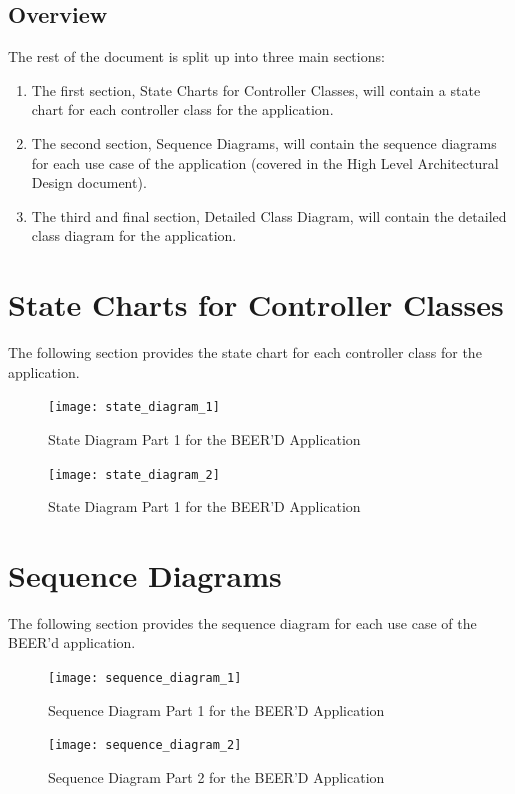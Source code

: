 \documentclass[]{article}
\begin{document}
\subsection{Overview}
\label{sub:overview}
The rest of the document is split up into three main sections:
\begin{enumerate}[-]
	\item The first section, State Charts for Controller Classes, will contain a state chart for each controller class for the application.
	\item The second section, Sequence Diagrams, will contain the sequence diagrams for each use case of the application (covered in the High Level Architectural Design document).
	\item The third and final section, Detailed Class Diagram, will contain the detailed class diagram for the application.
\end{enumerate}




\newpage
\section{State Charts for Controller Classes}
\label{sec:state_charts_for_controller_classes}
The following section provides the state chart for each controller class for the application.
\begin{figure}[!htbp]
\texttt{[image: state\_diagram\_1]}
\caption{State Diagram Part 1 for the BEER'D Application}
\end{figure}
\begin{figure}[!htbp]
\texttt{[image: state\_diagram\_2]}
\caption{State Diagram Part 1 for the BEER'D Application}
\end{figure}







\newpage
\section{Sequence Diagrams}
\label{sec:sequence_diagrams}
The following section provides the sequence diagram for each use case of the BEER'd application.
\begin{figure}[!htbp]
\texttt{[image: sequence\_diagram\_1]}
\caption{Sequence Diagram Part 1 for the BEER'D Application}
\end{figure}
\begin{figure}[!htbp]
\texttt{[image: sequence\_diagram\_2]}
\caption{Sequence Diagram Part 2 for the BEER'D Application}
\end{figure}
\end{document}
